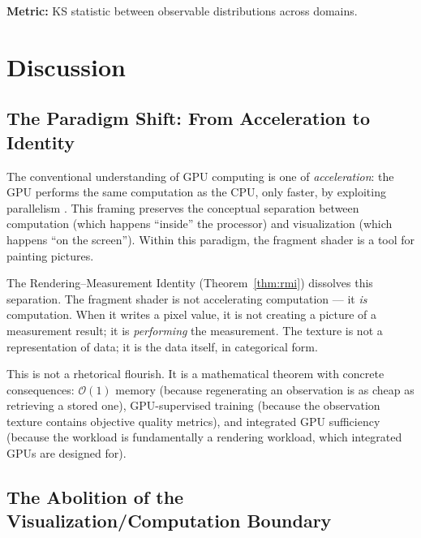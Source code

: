 \documentclass[11pt,twocolumn,a4paper]{article}
\newcommand{\BigO}{\mathcal{O}}
\begin{document}
\textbf{Metric:} KS statistic between observable distributions
across domains.



\section{Discussion}
\label{sec:discussion}

\subsection{The Paradigm Shift: From Acceleration to Identity}

The conventional understanding of GPU computing is one of
\emph{acceleration}: the GPU performs the same computation as the CPU,
only faster, by exploiting parallelism
\citep{owens2008,nickolls2008}. This framing preserves the conceptual
separation between computation (which happens ``inside'' the processor)
and visualization (which happens ``on the screen''). Within this
paradigm, the fragment shader is a tool for painting pictures.

The Rendering--Measurement Identity (Theorem~\ref{thm:rmi})
dissolves this separation. The fragment shader is not accelerating
computation --- it \emph{is} computation. When it writes a pixel
value, it is not creating a picture of a measurement result; it is
\emph{performing} the measurement. The texture is not a representation
of data; it is the data itself, in categorical form.

This is not a rhetorical flourish. It is a mathematical theorem with
concrete consequences: $\BigO(1)$ memory (because regenerating an
observation is as cheap as retrieving a stored one), GPU-supervised
training (because the observation texture contains objective quality
metrics), and integrated GPU sufficiency (because the workload is
fundamentally a rendering workload, which integrated GPUs are designed
for).

\subsection{The Abolition of the Visualization/Computation Boundary}
\end{document}
